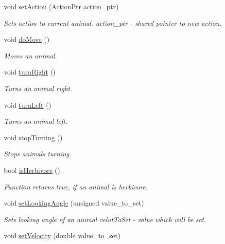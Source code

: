 \begin{DoxyCompactItemize}
void \hyperlink{class_animal_af796c149072c673e64778b73d4371ec4}{set\+Action} (Action\+Ptr action\+\_\+ptr)
\begin{DoxyCompactList}\small\item\em Sets action to current animal.  action\+\_\+ptr -\/ shared pointer to new action. \end{DoxyCompactList}\item 
void \hyperlink{class_animal_adcfe9aacffe9761ec25da5b202b74ee1}{do\+Move} ()
\begin{DoxyCompactList}\small\item\em Moves an animal. \end{DoxyCompactList}\item 
void \hyperlink{class_animal_a5a4e742f6f59293a734c97f0bec51446}{turn\+Right} ()
\begin{DoxyCompactList}\small\item\em Turns an animal right. \end{DoxyCompactList}\item 
void \hyperlink{class_animal_a89663265c1204cbea3ac738ec6a322a0}{turn\+Left} ()
\begin{DoxyCompactList}\small\item\em Turns an animal left. \end{DoxyCompactList}\item 
void \hyperlink{class_animal_af8213ebc97b4fc1a3f19fee9223bec3a}{stop\+Turning} ()
\begin{DoxyCompactList}\small\item\em Stops animal\textquotesingle{}s turning. \end{DoxyCompactList}\item 
bool \hyperlink{class_animal_a732095e2cd7155106d07f27c66bf2c32}{is\+Herbivore} ()
\begin{DoxyCompactList}\small\item\em Function returns true, if an animal is herbivore. \end{DoxyCompactList}\item 
void \hyperlink{class_animal_a26e010f9b80815b471dea886d9499ec8}{set\+Looking\+Angle} (unsigned value\+\_\+to\+\_\+set)
\begin{DoxyCompactList}\small\item\em Sets looking angle of an animal  velut\+To\+Set -\/ value which will be set. \end{DoxyCompactList}\item 
void \hyperlink{class_animal_a8df16f635e0fa5c7ff3ec1fabb4e9be7}{set\+Velocity} (double value\+\_\+to\+\_\+set)

\end{DoxyCompactItemize}
